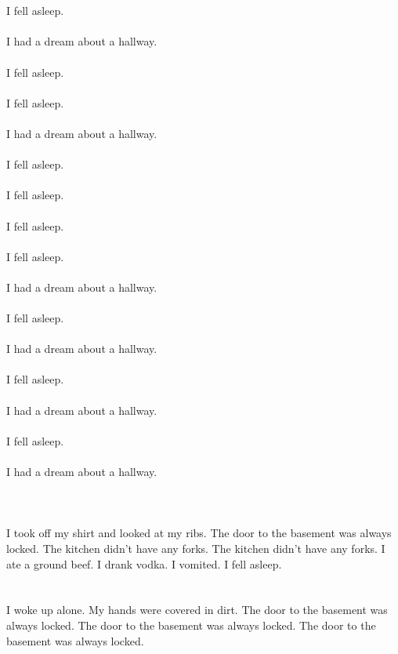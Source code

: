 \documentclass{article}
\begin{document}
    \section{}
    I fell asleep.\\\\I had a dream about a hallway.\\\\ I fell asleep.\\\\ I fell asleep.\\\\I had a dream about a hallway.\\\\ I fell asleep.\\\\ I fell asleep.\\\\ I fell asleep.\\\\ I fell asleep.\\\\I had a dream about a hallway.\\\\ I fell asleep.\\\\I had a dream about a hallway.\\\\ I fell asleep.\\\\I had a dream about a hallway.\\\\ I fell asleep.\\\\I had a dream about a hallway.\\\\ 
    \newpage
    
    \section{}
    I took off my shirt and looked at my ribs. The door to the basement was always locked. The kitchen didn't have any forks. The kitchen didn't have any forks. I ate a ground beef. I drank vodka. I vomited. I fell asleep.  
    \newpage
    
    \section{}
    I woke up alone. My hands were covered in dirt. The door to the basement was always locked. The door to the basement was always locked. The door to the basement was always locked.  
    \newpage
    
\end{document}
